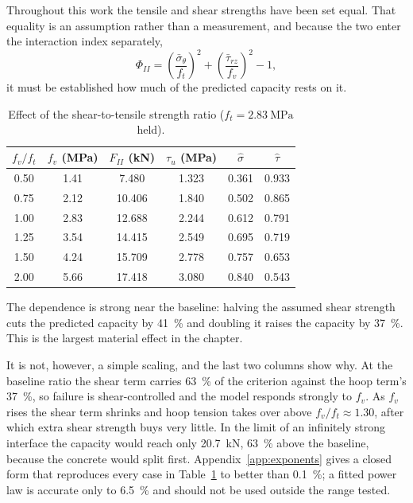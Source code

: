 Throughout this work the tensile and shear strengths have been set equal.
That equality is an assumption rather than a measurement, and because the
two enter the interaction index separately,
\begin{equation}
\label{eq:indexrecall}
\Phi_{II} = \left(\frac{\bar\sigma_\theta}{f_t}\right)^2
          + \left(\frac{\bar\tau_{rz}}{f_v}\right)^2 - 1 ,
\end{equation}
it must be established how much of the predicted capacity rests on it.
 
\begin{table}[H]
\centering
\caption{Effect of the shear-to-tensile strength ratio
         ($f_t = \SI{2.83}{\mega\pascal}$ held).}
\label{tab:sweepratio}
\small
\begin{tabular*}{\linewidth}{@{\extracolsep{\fill}}cccccc@{}}
\hline
$f_v/f_t$ & $f_v$ (MPa) & $F_{II}$ (kN) & $\tau_u$ (MPa)
          & $\hat\sigma$ & $\hat\tau$ \\
\hline
0.50 & 1.41 & 7.480  & 1.323 & 0.361 & 0.933 \\
0.75 & 2.12 & 10.406 & 1.840 & 0.502 & 0.865 \\
1.00 & 2.83 & 12.688 & 2.244 & 0.612 & 0.791 \\
1.25 & 3.54 & 14.415 & 2.549 & 0.695 & 0.719 \\
1.50 & 4.24 & 15.709 & 2.778 & 0.757 & 0.653 \\
2.00 & 5.66 & 17.418 & 3.080 & 0.840 & 0.543 \\
\hline
\end{tabular*}
\end{table}
 
The dependence is strong near the baseline: halving the assumed shear
strength cuts the predicted capacity by \SI{41}{\percent} and doubling it
raises the capacity by \SI{37}{\percent}. This is the largest material
effect in the chapter.
 
It is not, however, a simple scaling, and the last two columns show why.
At the baseline ratio the shear term carries \SI{63}{\percent} of the
criterion against the hoop term's \SI{37}{\percent}, so failure is
shear-controlled and the model responds strongly to $f_v$. As $f_v$ rises
the shear term shrinks and hoop tension takes over above
$f_v/f_t \approx 1.30$, after which extra shear strength buys very little.
In the limit of an infinitely strong interface the capacity would reach
only \SI{20.7}{\kilo\newton}, \SI{63}{\percent} above the baseline,
because the concrete would split first. Appendix~\ref{app:exponents} gives
a closed form that reproduces every case in Table~\ref{tab:sweepratio} to
better than \SI{0.1}{\percent}; a fitted power law is accurate only to
\SI{6.5}{\percent} and should not be used outside the range tested.
 
